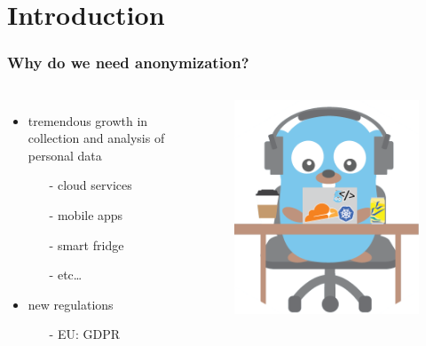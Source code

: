 \section{Introduction}

\begin{frame}
  \frametitle{Why do we need anonymization?}
  \begin{columns}
    \begin{itemize}
      \item{tremendous growth in collection and analysis of personal data\cite{aggarwal}}
        \begin{itemize}
          \item[-]{cloud services}
          \item[-]{mobile apps}
      \item[-]{smart fridge}
      \item[-]{etc\ldots}
        \end{itemize}
      \item{new regulations}
    \begin{itemize}
      \item[-]{EU: GDPR}
        \end{itemize}
    \end{itemize}
    \begin{figure}
      \includegraphics{../images/gopher-multimedia.png}
    \end{figure}
  \end{columns}
\end{frame}


